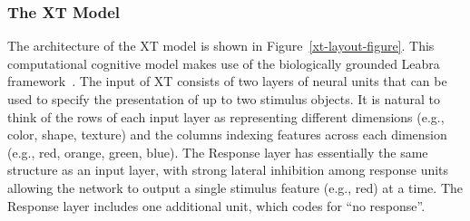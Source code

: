 
\subsubsection{The XT Model} 


The architecture of the XT model is shown in Figure~\ref{xt-layout-figure}.  This computational cognitive model makes use of the biologically grounded Leabra framework~\cite{OReillyRC:2000:Computational}.  The input of XT consists of two layers of neural units that can be used to specify the presentation of up to two stimulus objects.  It is natural to think of the rows of each input layer as representing different dimensions (e.g., color, shape, texture) and the columns indexing features across each dimension (e.g., red, orange, green, blue).  The Response layer has essentially the same structure as an input layer, with strong lateral inhibition among response units allowing the network to output a single stimulus feature (e.g., red) at a time.  The Response layer includes one additional unit, which codes for ``no response''.  

